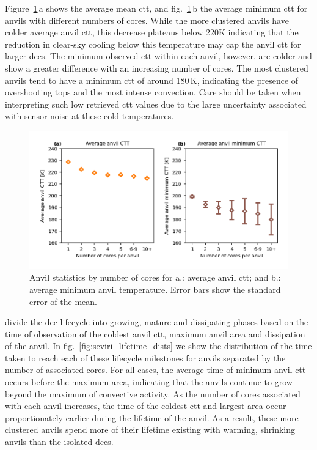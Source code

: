 \documentclass[acp, manuscript]{copernicus}
\begin{document}
Figure~\ref{fig:seviri_anvil_ctt_stats}\,a shows the average mean \acrshort{ctt}, and fig.~\ref{fig:seviri_anvil_ctt_stats}\,b the average minimum \acrshort{ctt} for anvils with different numbers of cores. 
While the more clustered anvils have colder average anvil \acrshort{ctt}, this decrease plateaus below 220K indicating that the reduction in clear-sky cooling below this temperature may cap the anvil \acrshort{ctt} for larger \acrshort{dcc}s. 
The minimum observed \acrshort{ctt} within each anvil, however, are colder and show a greater difference with an increasing number of cores. 
The most clustered anvils tend to have a minimum \acrshort{ctt} of around 180\,\unit{K}, indicating the presence of overshooting tops and the most intense convection. 
Care should be taken when interpreting such low retrieved \acrshort{ctt} values due to the large uncertainty associated with sensor noise at these cold temperatures.


\begin{figure}[tp]
    \includegraphics[width=12cm]{figures/fig07.png}
    \caption[
    Anvil statistics by number of cores for average anvil \acrshort{ctt} and average minimum anvil temperature
    ]{
    Anvil statistics by number of cores for a.: average anvil \acrshort{ctt}; and b.: average minimum anvil temperature. Error bars show the standard error of the mean.
    }
    \label{fig:seviri_anvil_ctt_stats}
\end{figure}


\citet{futyan_deep_2007} divide the \acrshort{dcc} lifecycle into growing, mature and dissipating phases based on the time of observation of the coldest anvil \acrshort{ctt}, maximum anvil area and dissipation of the anvil. 
In fig.~\ref{fig:seviri_lifetime_dists} we show the distribution of the time taken to reach each of these lifecycle milestones for anvils separated by the number of associated cores. 
For all cases, the average time of minimum anvil \acrshort{ctt} occurs before the maximum area, indicating that the anvils continue to grow beyond the maximum of convective activity. 
As the number of cores associated with each anvil increases, the time of the coldest \acrshort{ctt} and largest area occur proportionately earlier during the lifetime of the anvil. 
As a result, these more clustered anvils spend more of their lifetime existing with warming, shrinking anvils than the isolated \acrshort{dcc}s.
\end{document}
